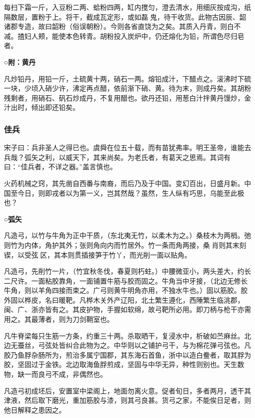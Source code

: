 \documentclass[]{article}
\begin{document}
每扫下霜一斤，入豆粉二两、蛤粉四两，缸内搅匀，澄去清水，用细灰按成沟，纸隔数层，置粉于上。将干，截成瓦定形，或如磊鬼，待干收货。此物古因辰、韶诸郡专造，故曰韶粉（俗误朝粉）。今则各省直饶为之矣。其质入丹青，则白不减。揸妇人颊，能使本色转青。胡粉投入炭炉中，仍还熔化为铅，所谓色尽归皂者。

\textbf{○附：黄丹}

凡炒铅丹，用铅一斤，土硫黄十两，硝石一两。熔铅成汁，下醋点之。滚沸时下硫一块，少顷入硝少许，沸定再点醋，依前渐下硝、黄。待为末，则成丹矣。其胡粉残剩者，用硝石、矾石炒成丹，不复用醋也。欲丹还铅，用葱白汁拌黄丹馒炒，金汁出时，倾出即还铅矣。

\hypertarget{header-n2705}{%
\subsubsection{佳兵}\label{header-n2705}}

宋子曰：兵非圣人之得已也。虞舜在位五十载，而有苗犹弗率。明王圣帝，谁能去兵哉？弧矢之利，以威天下，其来尚矣。为老氏者，有葛天之思焉。其词有曰：``佳兵者，不详之器。''盖言慎也。

火药机械之窍，其先凿自西番与南裔，而后乃及于中国。变幻百出，日盛月新。中国至今日，则即戎者以为第一义，岂其然哉？虽然，生人纵有巧思，乌能至此极也？

\textbf{○弧矢}

凡造弓，以竹与牛角为正中干质，（东北夷无竹，以柔木为之。）桑枝木为两梢。弛则竹为内体，角护其外；张则角向内而竹居外。竹一条而角两接，桑肖则其末刻锲，以受弦区，其本则贯插接笋于竹丫，而光削一面以贴角。

凡造弓，先削竹一片，（竹宜秋冬伐，春夏则朽蛀。）中腰微亚小，两头差大，约长二尺许。一面粘胶靠角，一面铺置牛筋与胶而固之。牛角当中牙接，（北边无修长牛角，则以羊角四接而束之。广弓则黄牛明角亦用，不独水牛也。）固以筋胶。胶外固以桦皮，名曰暖靶。凡桦木关外产辽阳，北土繁生遵化，西陲繁生临洮郡，闽、广、浙亦皆有之。其皮护物，手握如软绵，故弓靶所必用。即刀柄与枪干亦需用之。其最薄者，则为刀剑鞘室也。

凡牛脊梁每只生筋一方条，约重三十两。杀取晒干，复浸水中，析破如苎麻丝。北边无蚕丝，弓弦处皆纠合此物为之。中华则以之铺护弓干，与为棉花弹弓弦也。凡胶乃鱼脬杂肠所为，煎治多属宁国郡，其东海石首鱼，浙中以造白鲞者，取其脬为胶，坚固过于金铁。北边取海鱼脬煎成，坚固与中华无异，种性则别也。天生数物，缺一而良弓不成，非偶然也。

凡造弓初成坯后，安置室中梁阁上，地面勿离火意。促者旬日，多者两月，透干其津液，然后取下磨光，重加筋胶与漆，则其弓良甚。货弓之家，不能俟日足者，则他日解释之患因之。
\end{document}
